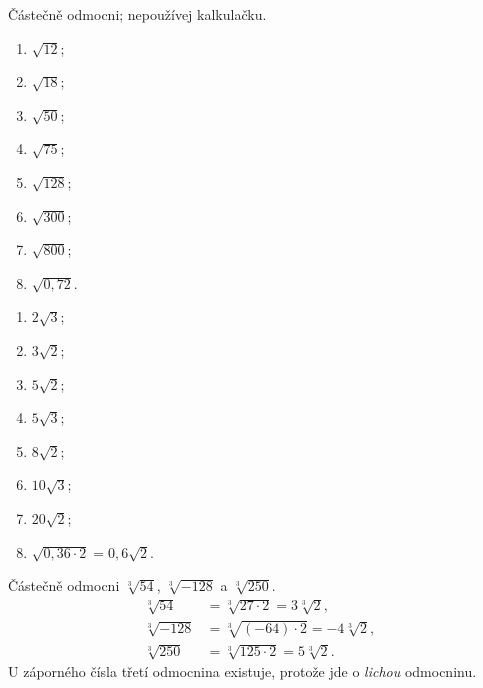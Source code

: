 \documentclass[11pt,a4paper]{article}
\begin{document}
\begin{zadaniReseniBox}[breakable=false,title={Samostatná práce 1}]
Částečně odmocni; nepoužívej kalkulačku.
\begin{enumerate}[label=\alph*)]
\item $\sqrt{12}$; \item $\sqrt{18}$; \item $\sqrt{50}$; \item $\sqrt{75}$;
\item $\sqrt{128}$; \item $\sqrt{300}$; \item $\sqrt{800}$; \item $\sqrt{0{,}72}$.
\end{enumerate}
\tcblower
\begin{enumerate}[label=\alph*)]
\item $2\sqrt3$; \item $3\sqrt2$; \item $5\sqrt2$; \item $5\sqrt3$;
\item $8\sqrt2$; \item $10\sqrt3$; \item $20\sqrt2$;
\item $\sqrt{0{,}36\cdot2}=0{,}6\sqrt2$.
\end{enumerate}
\end{zadaniReseniBox}

\begin{prikladReseniBox}[breakable=false,title={Příklad 2}]
Částečně odmocni $\sqrt[3]{54}$, $\sqrt[3]{-128}$ a $\sqrt[3]{250}$.
\tcblower
\[
\begin{aligned}
\sqrt[3]{54}&=\sqrt[3]{27\cdot2}=3\sqrt[3]2,\\
\sqrt[3]{-128}&=\sqrt[3]{(-64)\cdot2}=-4\sqrt[3]2,\\
\sqrt[3]{250}&=\sqrt[3]{125\cdot2}=5\sqrt[3]2.
\end{aligned}
\]
U záporného čísla třetí odmocnina existuje, protože jde o \emph{lichou} odmocninu.
\end{prikladReseniBox}
\end{document}
